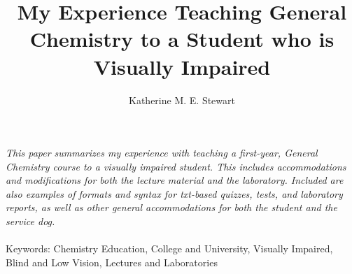 \documentclass[11.5pt]{sig-alternate} %
\makeatletter
\let\oldabstract\abstract
\let\oldendabstract\endabstract
\renewenvironment{abstract} %
{\renewenvironment{quotation}%
               {\list{}{\addtolength{\leftmargin}{1em} %
                        \listparindent 1.5em%
                        \itemindent    \listparindent%
                        \rightmargin   \leftmargin%
                        \parsep        \z@ \@plus\p@}%
                \item\relax}%
               {\endlist}%
\oldabstract}
{\oldendabstract}
\makeatother
\begin{document}
\title{My Experience Teaching General Chemistry
to a Student who is Visually Impaired}

\author[1]{\large \color{blue}Katherine M. E. Stewart}


\toappear{}
\maketitle
\begin{@twocolumnfalse} 
\begin{abstract}
\item 
\textit {This paper summarizes my experience with teaching a first-year, General Chemistry course to a visually impaired student. This includes accommodations and modifications for both the lecture material and the laboratory. Included are also examples of formats and syntax for txt-based quizzes, tests, and laboratory reports, as well as other general accommodations for both the student and the service dog.}
\\ \\
Keywords: Chemistry Education, College and University, Visually Impaired, Blind and Low Vision, Lectures and Laboratories
\end{abstract}
\end{@twocolumnfalse}

\end{document}
